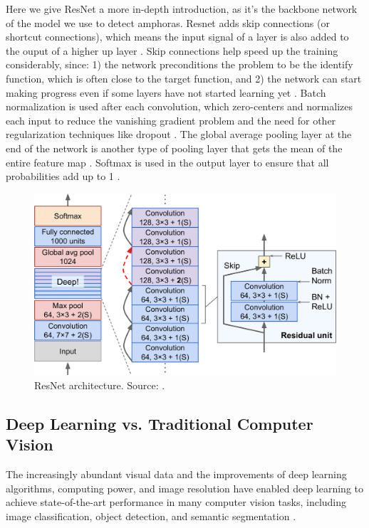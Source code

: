 \documentclass[a4paper,11pt,oneside]{article}
\begin{document}
  Here we give ResNet a more in-depth introduction, as it's the backbone network of the model we use to detect amphoras.
  Resnet adds skip connections (or shortcut connections), which means the input signal of a layer is also added to the
  ouput of a higher up layer \cite{geron2019hands, he2016deep}. Skip connections help speed up the training considerably,
  since: 1) the network preconditions the problem to be the identify function, which is often close to the target function,
  and 2) the network can start making progress even if some layers have not started learning yet
  \cite{geron2019hands, he2016deep}. Batch normalization \cite{ioffe2015batch} is used after each convolution, which
  zero-centers and normalizes each input to reduce the vanishing gradient problem \cite{hochreiter1998vanishing} and the
  need for other regularization techniques like dropout \cite{srivastava2014dropout} \cite{geron2019hands, he2016deep}.
  The global average pooling layer at the end of the network is another type of pooling layer that gets the mean of the
  entire feature map \cite{geron2019hands, he2016deep}. Softmax is used in the output layer to ensure that all
  probabilities add up to 1 \cite{geron2019hands, he2016deep}.

  \begin{figure}[ht]
    \begin{center}
      \includegraphics[width=.8\textwidth]{resnet.png}
    \end{center}
    \caption{ResNet architecture. Source: \cite{geron2019hands}.}
  \end{figure}

  \subsection{Deep Learning vs. Traditional Computer Vision}

  The increasingly abundant visual data and the improvements of deep learning algorithms, computing power, and image
  resolution have enabled deep learning to achieve state-of-the-art performance in many computer vision tasks, including
  image classification, object detection, and semantic segmentation \cite{qin2015underwater, voulodimos2018deep, o2019deep}.
\end{document}

